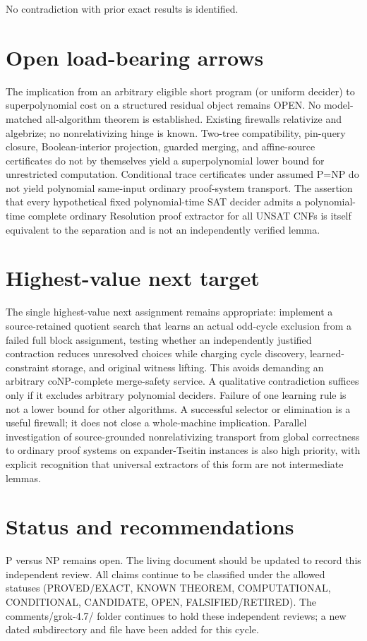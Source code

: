 \documentclass[11pt]{article}
\begin{document}
No contradiction with prior exact results is identified.

\section{Open load-bearing arrows}
The implication from an arbitrary eligible short program (or uniform decider) to superpolynomial cost on a structured residual object remains OPEN. No model-matched all-algorithm theorem is established. Existing firewalls relativize and algebrize; no nonrelativizing hinge is known. Two-tree compatibility, pin-query closure, Boolean-interior projection, guarded merging, and affine-source certificates do not by themselves yield a superpolynomial lower bound for unrestricted computation. Conditional trace certificates under assumed P=NP do not yield polynomial same-input ordinary proof-system transport. The assertion that every hypothetical fixed polynomial-time SAT decider admits a polynomial-time complete ordinary Resolution proof extractor for all UNSAT CNFs is itself equivalent to the separation and is not an independently verified lemma.

\section{Highest-value next target}
The single highest-value next assignment remains appropriate: implement a source-retained quotient search that learns an actual odd-cycle exclusion from a failed full block assignment, testing whether an independently justified contraction reduces unresolved choices while charging cycle discovery, learned-constraint storage, and original witness lifting. This avoids demanding an arbitrary coNP-complete merge-safety service. A qualitative contradiction suffices only if it excludes arbitrary polynomial deciders. Failure of one learning rule is not a lower bound for other algorithms. A successful selector or elimination is a useful firewall; it does not close a whole-machine implication. Parallel investigation of source-grounded nonrelativizing transport from global correctness to ordinary proof systems on expander-Tseitin instances is also high priority, with explicit recognition that universal extractors of this form are not intermediate lemmas.

\section{Status and recommendations}
P versus NP remains open. The living document should be updated to record this independent review. All claims continue to be classified under the allowed statuses (PROVED/EXACT, KNOWN THEOREM, COMPUTATIONAL, CONDITIONAL, CANDIDATE, OPEN, FALSIFIED/RETIRED). The comments/grok-4.7/ folder continues to hold these independent reviews; a new dated subdirectory and file have been added for this cycle.

\end{document}
